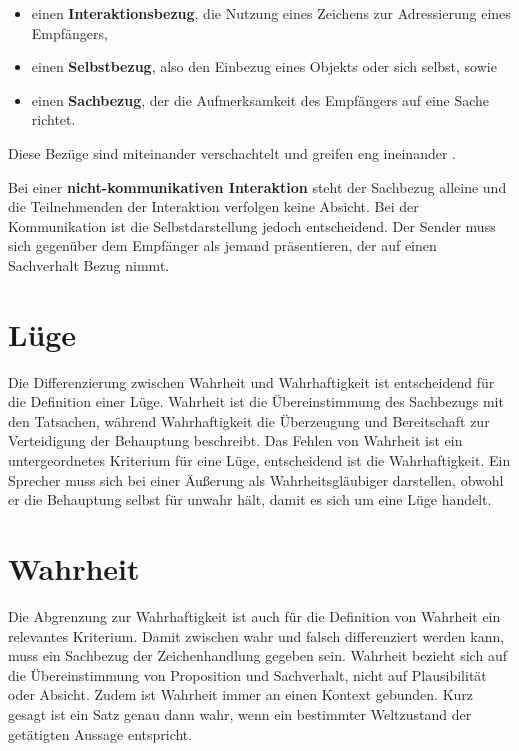 \begin{itemize}
    \item einen \textbf{Interaktionsbezug}, die Nutzung eines Zeichens zur Adressierung eines Empfängers,
    \item einen \textbf{Selbstbezug}, also den Einbezug eines Objekts oder sich selbst, sowie
    \item einen \textbf{Sachbezug}, der die Aufmerksamkeit des Empfängers auf eine Sache richtet.
\end{itemize}

Diese Bezüge sind miteinander verschachtelt und greifen eng ineinander \cite[S. 19 f.]{001_MKO02_media-as-means-of-communication}.

Bei einer \textbf{nicht-kommunikativen Interaktion} steht der Sachbezug alleine und die Teilnehmenden der Interaktion verfolgen keine Absicht. Bei der Kommunikation ist die Selbstdarstellung jedoch entscheidend. Der Sender muss sich gegenüber dem Empfänger als jemand präsentieren, der auf einen Sachverhalt Bezug nimmt.

\section{Lüge}
\label{sec:02-03_lie}

Die Differenzierung zwischen Wahrheit und Wahrhaftigkeit ist entscheidend für die Definition einer Lüge. Wahrheit ist die Übereinstimmung des Sachbezugs mit den Tatsachen, während Wahrhaftigkeit die Überzeugung und Bereitschaft zur Verteidigung der Behauptung beschreibt. Das Fehlen von Wahrheit ist ein untergeordnetes Kriterium für eine Lüge, entscheidend ist die Wahrhaftigkeit. Ein Sprecher muss sich bei einer Äußerung als Wahrheitsgläubiger darstellen, obwohl er die Behauptung selbst für unwahr hält, damit es sich um eine Lüge handelt. \cite[S. 24 f.]{001_MKO02_media-as-means-of-communication}

\section{Wahrheit}
\label{sec:02-04_truth}

Die Abgrenzung zur Wahrhaftigkeit ist auch für die Definition von Wahrheit ein relevantes Kriterium. Damit zwischen wahr und falsch differenziert werden kann, muss ein Sachbezug der Zeichenhandlung gegeben sein. Wahrheit bezieht sich auf die Übereinstimmung von Proposition und Sachverhalt, nicht auf Plausibilität oder Absicht. Zudem ist Wahrheit immer an einen Kontext gebunden. \cite[S. 24 f.]{001_MKO02_media-as-means-of-communication} Kurz gesagt ist ein Satz genau dann wahr, wenn ein bestimmter Weltzustand der getätigten Aussage entspricht. \cite[S. 16]{000_MKO01_communication-and-semiotics}

